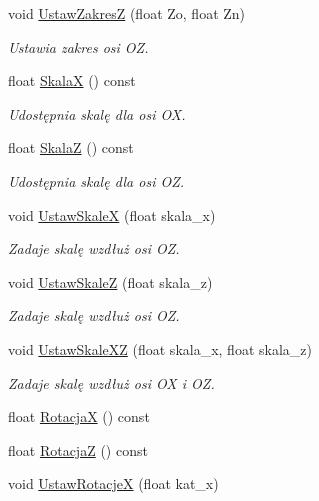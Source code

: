 \begin{DoxyCompactItemize}
void \hyperlink{classPzG_1_1LaczeDoGNUPlota_a1dbbb2b86fb13b8632e6bad9df2a82e3}{Ustaw\+ZakresZ} (float Zo, float Zn)
\begin{DoxyCompactList}\small\item\em Ustawia zakres osi {\itshape OZ}. \end{DoxyCompactList}\item 
float \hyperlink{classPzG_1_1LaczeDoGNUPlota_a4b1eb252fd785a5aeff938e7b2dce2b1}{SkalaX} () const
\begin{DoxyCompactList}\small\item\em Udostępnia skalę dla osi {\itshape OX}. \end{DoxyCompactList}\item 
float \hyperlink{classPzG_1_1LaczeDoGNUPlota_a44f922ccbc508d6cd7809c669238dae3}{SkalaZ} () const
\begin{DoxyCompactList}\small\item\em Udostępnia skalę dla osi {\itshape OZ}. \end{DoxyCompactList}\item 
void \hyperlink{classPzG_1_1LaczeDoGNUPlota_a855b8338bfe3e5d294d719f24b11090e}{Ustaw\+SkaleX} (float skala\+\_\+x)
\begin{DoxyCompactList}\small\item\em Zadaje skalę wzdłuż osi {\itshape OZ}. \end{DoxyCompactList}\item 
void \hyperlink{classPzG_1_1LaczeDoGNUPlota_ab0486db3166d8db6580a221079af241f}{Ustaw\+SkaleZ} (float skala\+\_\+z)
\begin{DoxyCompactList}\small\item\em Zadaje skalę wzdłuż osi {\itshape OZ}. \end{DoxyCompactList}\item 
void \hyperlink{classPzG_1_1LaczeDoGNUPlota_a4308151b54e105d302803146a3238699}{Ustaw\+Skale\+XZ} (float skala\+\_\+x, float skala\+\_\+z)
\begin{DoxyCompactList}\small\item\em Zadaje skalę wzdłuż osi {\itshape OX} i {\itshape OZ}. \end{DoxyCompactList}\item 
float \hyperlink{classPzG_1_1LaczeDoGNUPlota_addf0b844f626f3f5220de70efcbbdbb3}{RotacjaX} () const
\item 
float \hyperlink{classPzG_1_1LaczeDoGNUPlota_a9dac73754fab10644b287756003e9c79}{RotacjaZ} () const
\item 
void \hyperlink{classPzG_1_1LaczeDoGNUPlota_a88324c53a70846fb6bc9d918ce21fd56}{Ustaw\+RotacjeX} (float kat\+\_\+x)

\end{DoxyCompactItemize}
